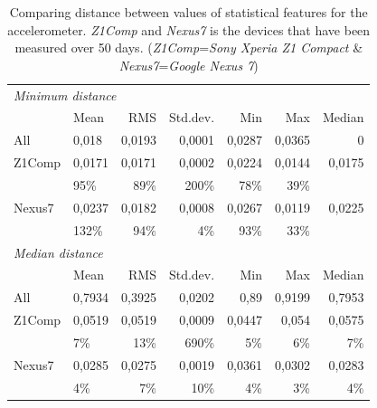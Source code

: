 \begin{table}[htbp]
  \centering
    \begin{tabular}{llrrrrr}
    \toprule
    \multicolumn{3}{l}{\textit{Minimum distance}} &       &       &       &  \\
          & Mean  & RMS   & Std.dev. & Min   & Max   & Median \\
    \midrule
    All   & 0,018 & 0,0193 & 0,0001 & 0,0287 & 0,0365 & 0 \\
    Z1Comp & 0,0171 & 0,0171 & 0,0002 & 0,0224 & 0,0144 & 0,0175 \\
          & 95\%  & 89\%  & 200\% & 78\%  & 39\%  &  \\
    Nexus7 & 0,0237 & 0,0182 & 0,0008 & 0,0267 & 0,0119 & 0,0225 \\
          & 132\% & 94\%  & 4\%   & 93\%  & 33\%  &  \\ 
    \toprule
    \multicolumn{3}{l}{\textit{Median distance}} &       &       &       &  \\
          & Mean  & RMS   & Std.dev. & Min   & Max   & Median \\
    \midrule
    All   & 0,7934 & 0,3925 & 0,0202 & 0,89  & 0,9199 & 0,7953 \\
    Z1Comp & 0,0519 & 0,0519 & 0,0009 & 0,0447 & 0,054 & 0,0575 \\
          & 7\%   & 13\%  & 690\% & 5\%   & 6\%   & 7\% \\
    Nexus7 & 0,0285 & 0,0275 & 0,0019 & 0,0361 & 0,0302 & 0,0283 \\
          & 4\%   & 7\%   & 10\%  & 4\%   & 3\%   & 4\% \\
    \bottomrule
    \end{tabular}%
    \caption{Comparing distance between values of statistical features for the accelerometer. \textit{Z1Comp} and \textit{Nexus7} is the devices that have been measured over 50 days. (\textit{Z1Comp}=\textit{Sony Xperia Z1 Compact} \& \textit{Nexus7}=\textit{Google Nexus 7})}
  \label{tab:addlabel}%
\end{table}%


